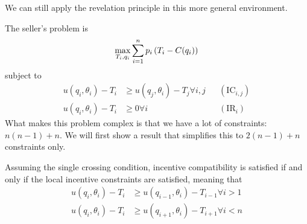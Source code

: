 \documentclass[10pt]{article}
\begin{document}
\begin{remark}
	We can still apply the revelation principle in this more general environment.
\end{remark}

The seller's problem is \[\max_{T_i,q_i} \sum_{i=1}^n p_i\left( T_i - C(q_i)\right)\]subject to\begin{align*} u(q_i,\theta_i) - T_i &\ge u(q_j,\theta_i) - T_j \forall i,j &&(\text{IC}_{i,j}) \\ u(q_i,\theta_i) - T_i &\ge 0 \forall i &&(\text{IR}_i)\end{align*}What makes this problem complex is that we have a lot of constraints: $n(n-1)+n$. We will first show a result that simplifies this to $2(n-1)+n$ constraints only. 

\begin{proposition}
	Assuming the single crossing condition, incentive compatibility is satisfied if and only if the local incentive constraints are satisfied, meaning that \begin{align*} u(q_i,\theta_i) - T_i &\ge u(q_{i-1},\theta_i) - T_{i-1} \forall i > 1 \\ u(q_i,\theta_i) - T_i &\ge u(q_{i+1},\theta_i) - T_{i+1} \forall i < n\end{align*}
\end{proposition}
\end{document}
